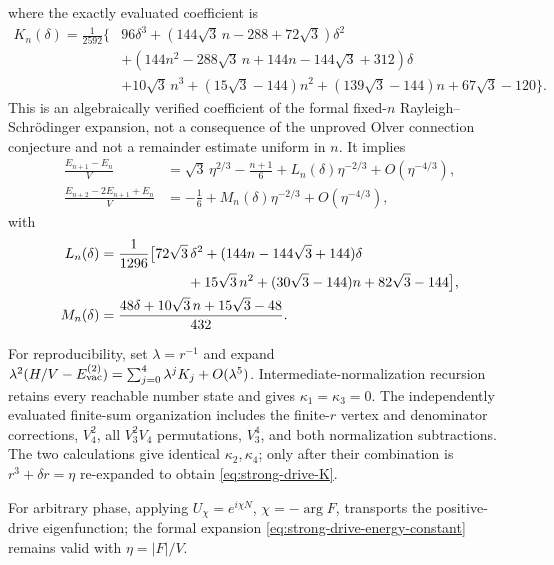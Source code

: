 \documentclass[11pt]{article}
\theoremstyle{remark}
\begin{document}
where the exactly evaluated coefficient is
\begin{align}
 K_n(\delta)=\frac1{2592}\bigl\{&
 96\delta^3+(144\sqrt3\,n-288+72\sqrt3)\delta^2\nonumber\\
 &+(144n^2-288\sqrt3\,n+144n-144\sqrt3+312)\delta\nonumber\\
 &+10\sqrt3\,n^3+(15\sqrt3-144)n^2
 +(139\sqrt3-144)n+67\sqrt3-120\bigr\}.
 \label{eq:strong-drive-K}
\end{align}
This is an algebraically verified coefficient of the formal fixed-\(n\)
Rayleigh--Schr\"odinger expansion, not a consequence of the unproved Olver
connection conjecture and not a remainder estimate uniform in \(n\).
It implies
\begin{align}
 \frac{E_{n+1}-E_n}{V}
 &=\sqrt3\,\eta^{2/3}-\frac{n+1}{6}
 +L_n(\delta)\eta^{-2/3}+O(\eta^{-4/3}),\nonumber\\
 \frac{E_{n+2}-2E_{n+1}+E_n}{V}
 &=-\frac16+M_n(\delta)\eta^{-2/3}+O(\eta^{-4/3}),
 \label{eq:strong-drive-spacing}
\end{align}
with
\begin{align}
 L_n(\delta)&=\frac1{1296}\bigl[
 72\sqrt3\,\delta^2+(144n-144\sqrt3+144)\delta\nonumber\\
 &\hspace{22mm}+15\sqrt3\,n^2+(30\sqrt3-144)n
 +82\sqrt3-144\bigr],\nonumber\\
 M_n(\delta)&=\frac{48\delta+10\sqrt3\,n+15\sqrt3-48}{432}.
\end{align}

For reproducibility, set \(\lambda=r^{-1}\) and expand
\(\lambda^2(H/V-E_{\rm vac}^{(2)})=\sum_{j=0}^4\lambda^jK_j+O(\lambda^5)\).
Intermediate-normalization recursion retains every reachable number state
and gives \(\kappa_1=\kappa_3=0\).  The independently evaluated finite-sum
organization includes the finite-\(r\) vertex and denominator corrections,
\(V_4^2\), all \(V_3^2V_4\) permutations, \(V_3^4\), and both normalization
subtractions.  The two calculations give identical \(\kappa_2,\kappa_4\);
only after their combination is \(r^3+\delta r=\eta\) re-expanded to obtain
\eqref{eq:strong-drive-K}.

For arbitrary phase, applying
\(U_\chi=e^{i\chi N}\), \(\chi=-\arg F\), transports the positive-drive
eigenfunction; the formal expansion \eqref{eq:strong-drive-energy-constant}
remains valid with
\(\eta=|F|/V\).
\end{document}
